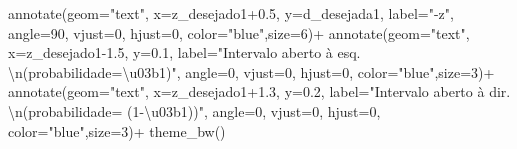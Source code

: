 \documentclass[
]{book}
\newenvironment{Shaded}{\begin{snugshade}}{\end{snugshade}}
\newcommand{\AttributeTok}[1]{\textcolor[rgb]{0.77,0.63,0.00}{#1}}
\newcommand{\DecValTok}[1]{\textcolor[rgb]{0.00,0.00,0.81}{#1}}
\newcommand{\FloatTok}[1]{\textcolor[rgb]{0.00,0.00,0.81}{#1}}
\newcommand{\FunctionTok}[1]{\textcolor[rgb]{0.00,0.00,0.00}{#1}}
\newcommand{\NormalTok}[1]{#1}
\newcommand{\SpecialCharTok}[1]{\textcolor[rgb]{0.00,0.00,0.00}{#1}}
\newcommand{\StringTok}[1]{\textcolor[rgb]{0.31,0.60,0.02}{#1}}
\begin{document}
\begin{Shaded}
\begin{Highlighting}[]
  \FunctionTok{annotate}\NormalTok{(}\AttributeTok{geom=}\StringTok{"text"}\NormalTok{, }\AttributeTok{x=}\NormalTok{z\_desejado1}\FloatTok{+0.5}\NormalTok{, }\AttributeTok{y=}\NormalTok{d\_desejada1, }\AttributeTok{label=}\StringTok{"{-}z"}\NormalTok{, }\AttributeTok{angle=}\DecValTok{90}\NormalTok{, }\AttributeTok{vjust=}\DecValTok{0}\NormalTok{, }\AttributeTok{hjust=}\DecValTok{0}\NormalTok{, }\AttributeTok{color=}\StringTok{"blue"}\NormalTok{,}\AttributeTok{size=}\DecValTok{6}\NormalTok{)}\SpecialCharTok{+}
  \FunctionTok{annotate}\NormalTok{(}\AttributeTok{geom=}\StringTok{"text"}\NormalTok{, }\AttributeTok{x=}\NormalTok{z\_desejado1}\FloatTok{{-}1.5}\NormalTok{, }\AttributeTok{y=}\FloatTok{0.1}\NormalTok{, }\AttributeTok{label=}\StringTok{"Intervalo aberto à esq. }\SpecialCharTok{\textbackslash{}n}\StringTok{(probabilidade=\textbackslash{}u03b1)"}\NormalTok{, }\AttributeTok{angle=}\DecValTok{0}\NormalTok{, }\AttributeTok{vjust=}\DecValTok{0}\NormalTok{, }\AttributeTok{hjust=}\DecValTok{0}\NormalTok{, }\AttributeTok{color=}\StringTok{"blue"}\NormalTok{,}\AttributeTok{size=}\DecValTok{3}\NormalTok{)}\SpecialCharTok{+}
  \FunctionTok{annotate}\NormalTok{(}\AttributeTok{geom=}\StringTok{"text"}\NormalTok{, }\AttributeTok{x=}\NormalTok{z\_desejado1}\FloatTok{+1.3}\NormalTok{, }\AttributeTok{y=}\FloatTok{0.2}\NormalTok{, }\AttributeTok{label=}\StringTok{"Intervalo aberto à dir. }\SpecialCharTok{\textbackslash{}n}\StringTok{(probabilidade= (1{-}\textbackslash{}u03b1))"}\NormalTok{, }\AttributeTok{angle=}\DecValTok{0}\NormalTok{, }\AttributeTok{vjust=}\DecValTok{0}\NormalTok{, }\AttributeTok{hjust=}\DecValTok{0}\NormalTok{, }\AttributeTok{color=}\StringTok{"blue"}\NormalTok{,}\AttributeTok{size=}\DecValTok{3}\NormalTok{)}\SpecialCharTok{+}
  \FunctionTok{theme\_bw}\NormalTok{()}
\end{Highlighting}
\end{Shaded}
\end{document}
